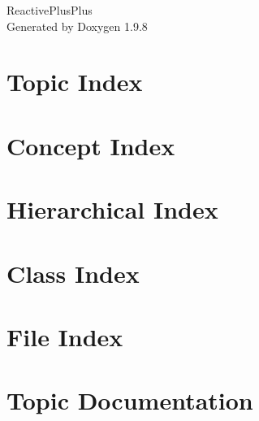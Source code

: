 \documentclass[twoside]{book}
\newcommand{\+}{\discretionary{\mbox{\scriptsize$\hookleftarrow$}}{}{}}
\newcommand{\clearemptydoublepage}{%
    \newpage{\pagestyle{empty}\cleardoublepage}%
  }
\begin{document}
  \raggedbottom
    \hypersetup{pageanchor=false,
                bookmarksnumbered=true,
                pdfencoding=unicode
               }
  \begin{titlepage}
  \vspace*{7cm}
  \begin{center}%
  {\Large Reactive\+Plus\+Plus}\\
  \vspace*{1cm}
  {\large Generated by Doxygen 1.9.8}\\
  \end{center}
  \end{titlepage}
  \clearemptydoublepage
  \tableofcontents
  \clearemptydoublepage
  \hypersetup{pageanchor=true}

\chapter{Topic Index}

\chapter{Concept Index}

\chapter{Hierarchical Index}

\chapter{Class Index}

\chapter{File Index}

\chapter{Topic Documentation}

\end{document}
